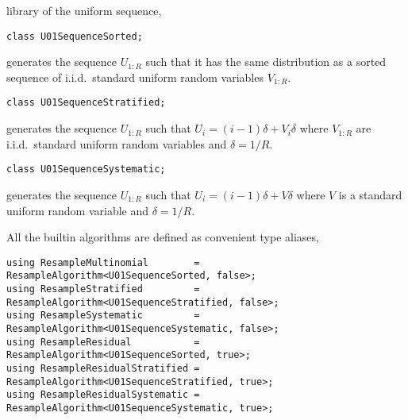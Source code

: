 library of the uniform sequence,
\begin{Verbatim}
class U01SequenceSorted;
\end{Verbatim}
generates the sequence $U_{1:R}$ such that it has the same distribution as a
sorted sequence of i.i.d.\ standard uniform random variables $V_{1:R}$.
\begin{Verbatim}
class U01SequenceStratified;
\end{Verbatim}
generates the sequence $U_{1:R}$ such that $U_i = (i - 1)\delta + V_i\delta$
where $V_{1:R}$ are i.i.d.\ standard uniform random variables and $\delta = 1 /
R$.
\begin{Verbatim}
class U01SequenceSystematic;
\end{Verbatim}
generates the sequence $U_{1:R}$ such that $U_i = (i - 1)\delta + V\delta$
where $V$ is a standard uniform random variable and $\delta = 1 / R$.

All the builtin algorithms are defined as convenient type aliases,
\begin{Verbatim}
using ResampleMultinomial        = ResampleAlgorithm<U01SequenceSorted, false>;
using ResampleStratified         = ResampleAlgorithm<U01SequenceStratified, false>;
using ResampleSystematic         = ResampleAlgorithm<U01SequenceSystematic, false>;
using ResampleResidual           = ResampleAlgorithm<U01SequenceSorted, true>;
using ResampleResidualStratified = ResampleAlgorithm<U01SequenceStratified, true>;
using ResampleResidualSystematic = ResampleAlgorithm<U01SequenceSystematic, true>;
\end{Verbatim}
